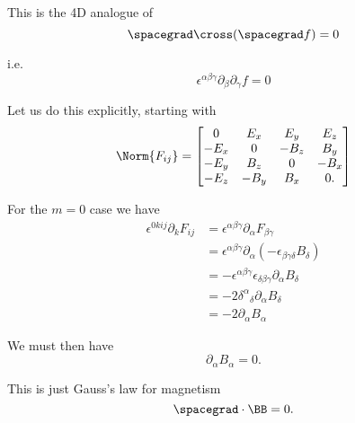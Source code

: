 This is the 4D analogue of
%
\begin{equation}\label{eqn:relativisticElectrodynamicsL11:790}
\spacegrad \cross (\spacegrad f) = 0
\end{equation}

i.e.
%
\begin{equation}\label{eqn:relativisticElectrodynamicsL11:810}
\epsilon^{\alpha\beta\gamma} \partial_\beta \partial_\gamma f = 0
\end{equation}

Let us do this explicitly, starting with
%
\begin{equation}\label{eqn:relativisticElectrodynamicsL11:370b}
\Norm{ F_{i j} } =
\begin{bmatrix}
0 & E_x & E_y & E_z \\
-E_x & 0 & -B_z & B_y \\
-E_y & B_z & 0 & -B_x \\
-E_z & -B_y & B_x & 0.
\end{bmatrix}
\end{equation}

For the \(m= 0\) case we have
%
\begin{equation}\label{eqn:relativisticElectrodynamicsL11b:1400}
\begin{aligned}
\epsilon^{0 k i j} \partial_k F_{i j}
&=
\epsilon^{\alpha \beta \gamma} \partial_\alpha F_{\beta \gamma} \\
&=
\epsilon^{\alpha \beta \gamma} \partial_\alpha (-\epsilon_{\beta \gamma \delta} B_\delta) \\
&=
-\epsilon^{\alpha \beta \gamma} \epsilon_{\delta \beta \gamma }
\partial_\alpha B_\delta \\
&=
- 2 {\delta^\alpha}_\delta \partial_\alpha B_\delta \\
&=
- 2 \partial_\alpha B_\alpha
\end{aligned}
\end{equation}

We must then have
%
\begin{equation}\label{eqn:relativisticElectrodynamicsL11:830}
\partial_\alpha B_\alpha = 0.
\end{equation}

This is just Gauss's law for magnetism
%
\begin{equation}\label{eqn:relativisticElectrodynamicsL11:850}
\spacegrad \cdot \BB = 0.
\end{equation}

